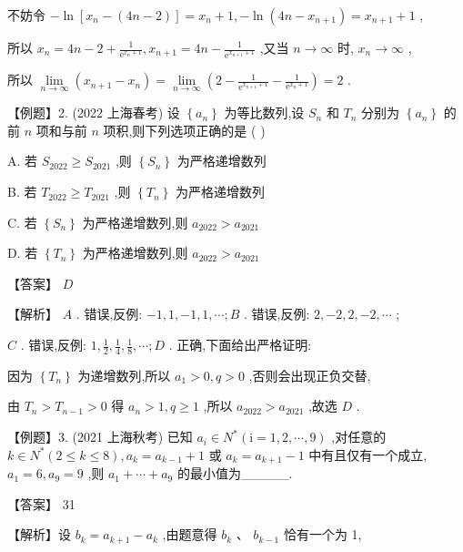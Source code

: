 \documentclass[10pt]{article}
\begin{document}
不妨令 \(- \ln \left\lbrack  {{x}_{n} - \left( {{4n} - 2}\right) }\right\rbrack   = {x}_{n} + 1, - \ln \left( {{4n} - {x}_{n + 1}}\right)  = {x}_{n + 1} + 1\) ,

所以 \({x}_{n} = {4n} - 2 + \frac{1}{{\mathrm{e}}^{{x}_{n} + 1}},{x}_{n + 1} = {4n} - \frac{1}{{\mathrm{e}}^{{x}_{n + 1} + 1}}\) ,又当 \(n \rightarrow  \infty\) 时, \({x}_{n} \rightarrow  \infty\) ,

所以 \(\mathop{\lim }\limits_{{n \rightarrow  \infty }}\left( {{x}_{n + 1} - {x}_{n}}\right)  = \mathop{\lim }\limits_{{n \rightarrow  \infty }}\left( {2 - \frac{1}{{\mathrm{e}}^{{x}_{n + 1} + 1}} - \frac{1}{{\mathrm{e}}^{{x}_{n} + 1}}}\right)  = 2\) .

【例题】2. (2022 上海春考) 设 \(\left\{  {a}_{n}\right\}\) 为等比数列,设 \({S}_{n}\) 和 \({T}_{n}\) 分别为 \(\left\{  {a}_{n}\right\}\) 的前 \(n\) 项和与前 \(n\) 项积,则下列选项正确的是 ( )

A. 若 \({S}_{2022} \geq  {S}_{2021}\) ,则 \(\left\{  {S}_{n}\right\}\) 为严格递增数列

B. 若 \({T}_{2022} \geq  {T}_{2021}\) ,则 \(\left\{  {T}_{n}\right\}\) 为严格递增数列

C. 若 \(\left\{  {S}_{n}\right\}\) 为严格递增数列,则 \({a}_{2022} > {a}_{2021}\)

D. 若 \(\left\{  {T}_{n}\right\}\) 为严格递增数列,则 \({a}_{2022} > {a}_{2021}\)

【答案】 \(D\)

【解析】 \(A\) . 错误,反例: \(- 1,1, - 1,1,\cdots ;B\) . 错误,反例: \(2, - 2,2, - 2,\cdots\) ;

\(C\) . 错误,反例: \(1,\frac{1}{2},\frac{1}{4},\frac{1}{8},\cdots ;D\) . 正确,下面给出严格证明:

因为 \(\left\{  {T}_{n}\right\}\) 为递增数列,所以 \({a}_{1} > 0,q > 0\) ,否则会出现正负交替,

由 \({T}_{n} > {T}_{n - 1} > 0\) 得 \({a}_{n} > 1,q \geq  1\) ,所以 \({a}_{2022} > {a}_{2021}\) ,故选 \(D\) .

【例题】3. (2021 上海秋考) 已知 \({a}_{i} \in  {N}^{ * }\left( {\mathrm{i} = 1,2,\cdots ,9}\right)\) ,对任意的 \(k \in  {N}^{ * }\left( {2 \leq  k \leq  8}\right) ,{a}_{k} = {a}_{k - 1} + 1\) 或 \({a}_{k} = {a}_{k + 1} - 1\) 中有且仅有一个成立, \({a}_{1} = 6,{a}_{9} = 9\) ,则 \({a}_{1} + \cdots  + {a}_{9}\) 的最小值为\_\_\_\_\_.

【答案】 31

【解析】设 \({b}_{k} = {a}_{k + 1} - {a}_{k}\) ,由题意得 \({b}_{k}\text{ 、 }{b}_{k - 1}\) 恰有一个为 1,
\end{document}
